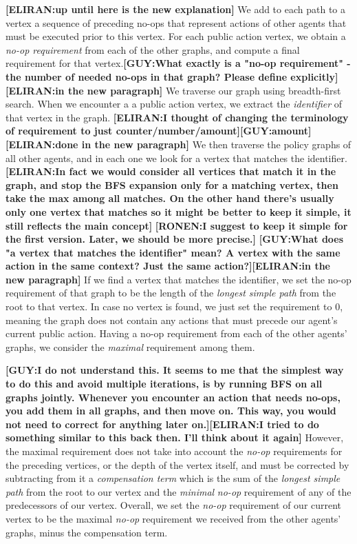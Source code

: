 \documentclass[letterpaper]{article} %
\newcommand{\eliran}[1]{\textbf{[\color{red}ELIRAN:#1]}}
\newcommand{\ronen}[1]{\textbf{[\color{blue}RONEN:#1]}}
\newcommand{\guy}[1]{\textbf{[\color{orange}GUY:#1]}}
\begin{document}
\eliran{up until here is the new explanation}
We add to each path to a vertex a sequence of preceding no-ops
that represent %
actions of other agents that must be executed prior to this vertex.
For each public action vertex, we obtain a \emph{no-op requirement} from each of the other graphs, and compute a final requirement for that vertex.\guy{What exactly is a "no-op requirement" - the number of needed no-ops in that graph? Please define explicitly}\eliran{in the new paragraph}
We traverse our graph using breadth-first search. When we encounter a a public action vertex, we extract the \emph{identifier} of that vertex in the graph. 
\eliran{I thought of changing the terminology of requirement to just counter/number/amount}\guy{amount}\eliran{done in the new paragraph}
We then traverse the policy graphs of all other agents, and in each one we look for a vertex that matches the identifier.
\eliran{In fact we would consider all vertices that match it in the graph, and stop the BFS expansion only for a matching vertex, then take the max among all matches. On the other hand there's usually only one vertex that matches so it might be better to keep it simple, it still reflects the main concept}
\ronen{I suggest to keep it simple for the first version. Later, we should be more precise.}
\guy{What does "a vertex that matches the identifier" mean? A vertex with the same action in the same context? Just the same action?}\eliran{in the new paragraph}
If we find a vertex that matches the identifier, we set the no-op requirement of that graph to be the length of the  \emph{longest simple path} from the root to that vertex. In case no vertex is found, we just set the requirement to 0, meaning the graph does not contain any actions that must precede our agent's current public action.
Having a no-op requirement from each of the other agents' graphs, we consider the \emph{maximal} requirement among them. 

\guy{I do not understand this. It seems to me that the simplest way to do this and avoid multiple iterations, is by running BFS on all graphs jointly. Whenever you encounter an action that needs no-ops, you add them in all graphs, and then move on. This way, you would not need to correct for anything later on.}\eliran{I tried to do something similar to this back then. I'll think about it again}
However, the maximal requirement does not take into account the {\em no-op} requirements for the preceding vertices, or the depth of the vertex itself, and must be
corrected by subtracting from it a \emph{compensation term} which is the sum of the \emph{longest simple path} from the root to our vertex and the \emph{minimal} {\em no-op} requirement of any of the predecessors of our vertex. Overall, we set the {\em no-op} requirement of our current vertex to be the maximal  {\em no-op} requirement we received from the other agents' graphs, minus the compensation term.
\end{document}
